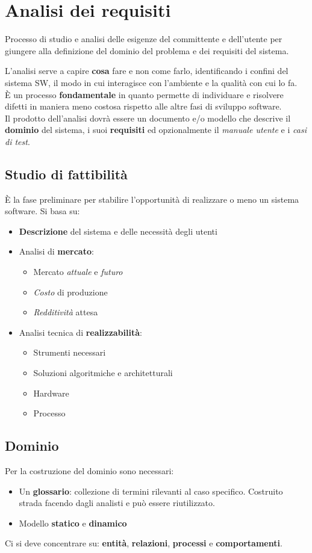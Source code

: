\newpage
\section{Analisi dei requisiti}
\begin{definition}
	Processo di studio e analisi delle esigenze del committente e dell'utente per giungere alla definizione del dominio del problema e dei requisiti del sistema.
\end{definition}
L'analisi serve a capire \textbf{cosa} fare e non come farlo, identificando i confini del sistema SW, il modo in cui interagisce con l'ambiente e la qualità con cui lo fa.\\
È un processo \textbf{fondamentale} in quanto permette di individuare e risolvere difetti in maniera meno costosa rispetto alle altre fasi di sviluppo software.\\
Il prodotto dell'analisi dovrà essere un documento e/o modello che descrive il \textbf{dominio} del sistema, i suoi \textbf{requisiti} ed opzionalmente il \textit{manuale utente} e i \textit{casi di test}.
\subsection{Studio di fattibilità}
È la fase preliminare per stabilire l'opportunità di realizzare o meno un sistema software. Si basa su:
\begin{itemize}
	\item \textbf{Descrizione} del sistema e delle necessità degli utenti
	\item Analisi di \textbf{mercato}:
	\begin{itemize}
		\item Mercato \textit{attuale} e \textit{futuro}
		\item \textit{Costo} di produzione
		\item \textit{Redditività} attesa
	\end{itemize}
	\item Analisi tecnica di \textbf{realizzabilità}:
	\begin{itemize}
		\item Strumenti necessari
		\item Soluzioni algoritmiche e architetturali
		\item Hardware
		\item Processo
	\end{itemize}
\end{itemize}

\subsection{Dominio}
Per la costruzione del dominio sono necessari:
\begin{itemize}
	\item Un \textbf{glossario}: collezione di termini rilevanti al caso specifico. Costruito strada facendo dagli analisti e può essere riutilizzato.
	\item Modello \textbf{statico} e \textbf{dinamico}
\end{itemize}
Ci si deve concentrare su: \textbf{entità}, \textbf{relazioni}, \textbf{processi} e \textbf{comportamenti}.

